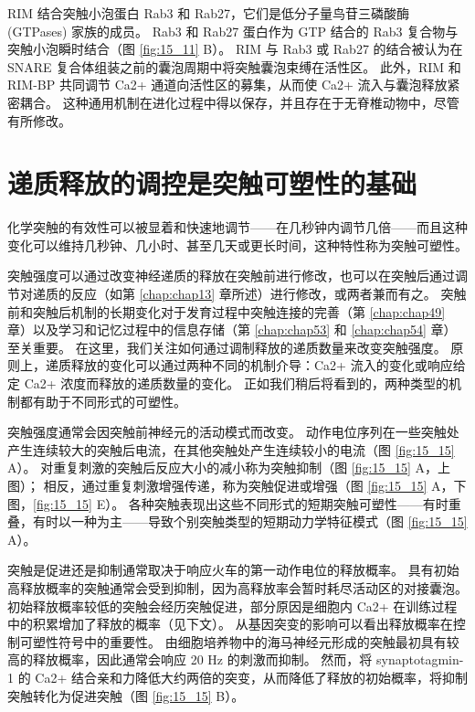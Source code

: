 RIM 结合突触小泡蛋白 Rab3 和 Rab27，它们是低分子量鸟苷三磷酸酶 (GTPases) 家族的成员。 
Rab3 和 Rab27 蛋白作为 GTP 结合的 Rab3 复合物与突触小泡瞬时结合（图 \ref{fig:15_11} B）。 
RIM 与 Rab3 或 Rab27 的结合被认为在 SNARE 复合体组装之前的囊泡周期中将突触囊泡束缚在活性区。 
此外，RIM 和 RIM-BP 共同调节 Ca2+ 通道向活性区的募集，从而使 Ca2+ 流入与囊泡释放紧密耦合。 
这种通用机制在进化过程中得以保存，并且存在于无脊椎动物中，尽管有所修改。



\section{递质释放的调控是突触可塑性的基础}

化学突触的有效性可以被显着和快速地调节——在几秒钟内调节几倍——而且这种变化可以维持几秒钟、几小时、甚至几天或更长时间，这种特性称为突触可塑性。


突触强度可以通过改变神经递质的释放在突触前进行修改，也可以在突触后通过调节对递质的反应（如第 \ref{chap:chap13} 章所述）进行修改，或两者兼而有之。 
突触前和突触后机制的长期变化对于发育过程中突触连接的完善（第 \ref{chap:chap49} 章）以及学习和记忆过程中的信息存储（第 \ref{chap:chap53} 和 \ref{chap:chap54} 章）至关重要。 
在这里，我们关注如何通过调制释放的递质数量来改变突触强度。 
原则上，递质释放的变化可以通过两种不同的机制介导：Ca2+ 流入的变化或响应给定 Ca2+ 浓度而释放的递质数量的变化。 
正如我们稍后将看到的，两种类型的机制都有助于不同形式的可塑性。


突触强度通常会因突触前神经元的活动模式而改变。 
动作电位序列在一些突触处产生连续较大的突触后电流，在其他突触处产生连续较小的电流（图 \ref{fig:15_15} A）。 
对重复刺激的突触后反应大小的减小称为突触抑制（图 \ref{fig:15_15} A，上图）； 
相反，通过重复刺激增强传递，称为突触促进或增强（图 \ref{fig:15_15} A，下图，\ref{fig:15_15} E）。 
各种突触表现出这些不同形式的短期突触可塑性——有时重叠，有时以一种为主——导致个别突触类型的短期动力学特征模式（图 \ref{fig:15_15} A）。


突触是促进还是抑制通常取决于响应火车的第一动作电位的释放概率。 
具有初始高释放概率的突触通常会受到抑制，因为高释放率会暂时耗尽活动区的对接囊泡。 
初始释放概率较低的突触会经历突触促进，部分原因是细胞内 Ca2+ 在训练过程中的积累增加了释放的概率（见下文）。 
从基因突变的影响可以看出释放概率在控制可塑性符号中的重要性。 
由细胞培养物中的海马神经元形成的突触最初具有较高的释放概率，因此通常会响应 20 Hz 的刺激而抑制。 
然而，将 synaptotagmin-1 的 Ca2+ 结合亲和力降低大约两倍的突变，从而降低了释放的初始概率，将抑制突触转化为促进突触（图 \ref{fig:15_15} B）。


